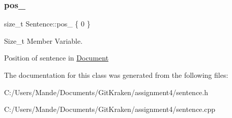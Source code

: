 \subsubsection{\texorpdfstring{pos\+\_\+}{pos\_}}
{\footnotesize\ttfamily size\+\_\+t Sentence\+::pos\+\_\+ \{ 0 \}\hspace{0.3cm}{\ttfamily [private]}}



Size\+\_\+t Member Variable. 

Position of sentence in \hyperlink{class_document}{Document} 

The documentation for this class was generated from the following files\+:\begin{DoxyCompactItemize}
\item 
C\+:/\+Users/\+Mande/\+Documents/\+Git\+Kraken/assignment4/sentence.\+h\item 
C\+:/\+Users/\+Mande/\+Documents/\+Git\+Kraken/assignment4/sentence.\+cpp\end{DoxyCompactItemize}
